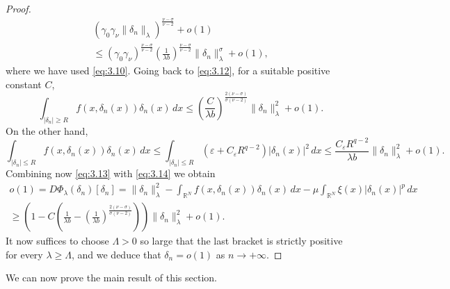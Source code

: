 \documentclass[11pt]{amsart}
\numberwithin{equation}{section}
\theoremstyle{remark}
\theoremstyle{definition}
\begin{document}
\begin{proof}
\begin{multline*}
\left(
\gamma_0 \gamma_\nu \|\delta_n\|_\lambda 
\right)^{\frac{\nu-\sigma}{\nu -2}} + o(1) \\
\leqslant \left(
\gamma_0 \gamma_\nu 
\right)^{\frac{\nu-\sigma}{\nu -2}} \left( \frac{1}{\lambda b} \right)^{\frac{\nu-\sigma}{\nu -2}}
\|\delta_n\|_\lambda^\sigma + o(1),
\end{multline*}
where we have used \eqref{eq:3.10}. Going back to \eqref{eq:3.12}, for a suitable positive constant $C$,
\begin{equation}\label{eq:3.13}
\int_{|\delta_n| \geqslant R} f(x,\delta_n(x)) \delta_n(x) \, dx \leqslant \left(\frac{C}{\lambda b}\right)^{\frac{2(\nu-\sigma)}{\sigma(\nu-2)}} \|\delta_n\|_\lambda^2 +o(1).
\end{equation}
On the other hand,
\begin{equation} \label{eq:3.14}
\int_{|\delta_n| \leqslant R} f(x,\delta_n(x)) \delta_n(x) \, dx \leqslant
\int_{|\delta_n| \leqslant R} \left( \varepsilon+ C_\varepsilon R^{q-2} \right) |\delta_n(x)|^2 \, dx \leqslant \frac{C_\varepsilon R^{q-2}}{\lambda b} \|\delta_n\|_\lambda^2 + o(1).
\end{equation}
Combining now \eqref{eq:3.13} with \eqref{eq:3.14} we obtain
\begin{multline*}
o(1) = D\Phi_\lambda (\delta_n)[\delta_n] = \|\delta_n\|_\lambda^2 - \int_{\mathbb{R}^N} f(x,\delta_n(x)) \delta_n(x)\, dx - \mu \int_{\mathbb{R}^N} \xi(x) |\delta_n(x)|^p \, dx \\
\geqslant
\left(
1 - C \left( \frac{1}{\lambda b} - \left(\frac{1}{\lambda b} \right)^{\frac{2(\nu-\sigma)}{\sigma(\nu-2)}} \right)
\right) \|\delta_n\|_\lambda^2 +o(1).
\end{multline*}
It now suffices to choose $\Lambda>0$ so large that the last bracket is strictly positive for every $\lambda \geqslant \Lambda$, and we deduce that $\delta_n =o(1)$ as $n \to +\infty$.
\end{proof}
We can now prove the main result of this section.
\end{document}
